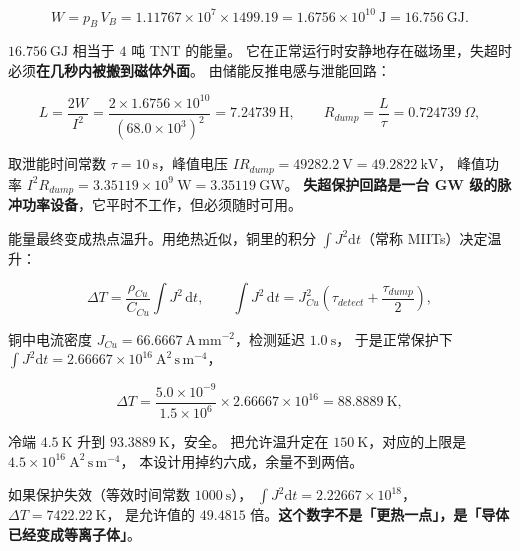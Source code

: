 \begin{equation}
W=p_B\,V_B
=1.11767\times10^{7}\times1499.19
=1.6756\times10^{10}\ \mathrm{J}=16.756\ \mathrm{GJ}.
\label{eq:app-am-energy}
\end{equation}

$16.756\ \mathrm{GJ}$ 相当于 $4$ 吨 TNT 的能量。
它在正常运行时安静地存在磁场里，失超时必须\textbf{在几秒内被搬到磁体外面}。
由储能反推电感与泄能回路：

\begin{equation}
L=\frac{2W}{I^{2}}
=\frac{2\times1.6756\times10^{10}}{(68.0\times10^{3})^{2}}
=7.24739\ \mathrm{H},
\qquad
R_{dump}=\frac{L}{\tau}=0.724739\ \Omega,
\label{eq:app-am-inductance}
\end{equation}

取泄能时间常数 $\tau=10\ \mathrm{s}$，峰值电压 $I R_{dump}=49282.2\ \mathrm{V}=49.2822\ \mathrm{kV}$，
峰值功率 $I^{2}R_{dump}=3.35119\times10^{9}\ \mathrm{W}=3.35119\ \mathrm{GW}$。
\textbf{失超保护回路是一台 GW 级的脉冲功率设备}，它平时不工作，但必须随时可用。

能量最终变成热点温升。用绝热近似，铜里的积分 $\int J^{2}\mathrm{d}t$（常称 MIITs）决定温升：

\begin{equation}
\Delta T=\frac{\rho_{Cu}}{C_{Cu}}\int J^{2}\,\mathrm{d}t,
\qquad
\int J^{2}\,\mathrm{d}t=J_{Cu}^{2}\left(\tau_{detect}+\frac{\tau_{dump}}{2}\right),
\label{eq:app-am-miits}
\end{equation}

铜中电流密度 $J_{Cu}=66.6667\ \mathrm{A\,mm^{-2}}$，检测延迟 $1.0\ \mathrm{s}$，
于是正常保护下 $\int J^{2}\mathrm{d}t=2.66667\times10^{16}\ \mathrm{A^{2}\,s\,m^{-4}}$，

\begin{equation}
\Delta T=\frac{5.0\times10^{-9}}{1.5\times10^{6}}\times2.66667\times10^{16}
=88.8889\ \mathrm{K},
\label{eq:app-am-dt}
\end{equation}

冷端 $4.5\ \mathrm{K}$ 升到 $93.3889\ \mathrm{K}$，安全。
把允许温升定在 $150\ \mathrm{K}$，对应的上限是 $4.5\times10^{16}\ \mathrm{A^{2}\,s\,m^{-4}}$，
本设计用掉约六成，余量不到两倍。

如果保护失效（等效时间常数 $1000\ \mathrm{s}$），
$\int J^{2}\mathrm{d}t=2.22667\times10^{18}$，$\Delta T=7422.22\ \mathrm{K}$，
是允许值的 $49.4815$ 倍。\textbf{这个数字不是「更热一点」，是「导体已经变成等离子体」}。

